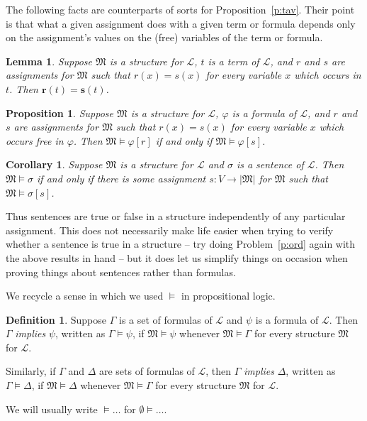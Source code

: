 \documentclass[12pt]{amsbook}
\theoremstyle{plain}
\newtheorem{prop}[thm]{Proposition}
\newtheorem{cor}[thm]{Corollary}
\newtheorem{lem}[thm]{Lemma}
\theoremstyle{definition}
\newtheorem{defn}{Definition}[chapter]
\theoremstyle{remark}
\begin{document}
The following facts are counterparts of sorts for Proposition~\ref{p:tav}.  Their point is that what a given assignment does with a given term or formula depends only on the assignment's values on the (free) variables of the term or formula.

\begin{lem}  \label{l:six7}
Suppose $\mathfrak{M}$ is a structure for $\mathcal{L}$,  $t$ is a term of $\mathcal{L}$,  and $r$ and $s$ are assignments for $\mathfrak{M}$ such that $r(x) = s(x)$ for every variable $x$ which occurs in $t$.  Then $\mathbf{r}(t) = \mathbf{s}(t)$.
\end{lem}

\begin{prop} \label{p:six8}
Suppose $\mathfrak{M}$ is a structure for $\mathcal{L}$,  $\varphi$ is a formula of $\mathcal{L}$,  and $r$ and $s$ are assignments for $\mathfrak{M}$ such that $r(x) = s(x)$ for every variable $x$ which occurs free in $\varphi$.  Then $\mathfrak{M} \models \varphi [r]$ if and only if $\mathfrak{M} \models \varphi [s]$.
\end{prop}

\begin{cor} \label{c:six9}
Suppose $\mathfrak{M}$ is a structure for $\mathcal{L}$ and $\sigma$ is a sentence of $\mathcal{L}$.  Then $\mathfrak{M} \models \sigma$ if and only if there is some assignment $s : V \to |\mathfrak{M}|$ for $\mathfrak{M}$ such that $\mathfrak{M} \models \sigma [s]$.
\end{cor}

Thus sentences are true or false in a structure independently of any particular assignment.  This does not necessarily make life easier when trying to verify whether a sentence is true in a structure -- try doing Problem~\ref{p:ord} again with the above results in hand -- but it does let us simplify things on occasion when proving things about sentences rather than formulas.

We recycle a sense in which we used $\models$\index{$\models$} in propositional logic.

\begin{defn} 
Suppose $\Gamma$ is a set of formulas of $\mathcal{L}$ and $\psi$ is a formula of $\mathcal{L}$.  Then $\Gamma$ {\em implies\/} $\psi$,  written as $\Gamma \models \psi$,  if $\mathfrak{M} \models \psi$ whenever $\mathfrak{M} \models \Gamma$ for every structure $\mathfrak{M}$ for $\mathcal{L}$.

Similarly,  if $\Gamma$ and $\Delta$ are sets of formulas of $\mathcal{L}$,  then $\Gamma$ {\em implies\/} $\Delta$,  written as $\Gamma \models \Delta$,  if $\mathfrak{M} \models \Delta$ whenever $\mathfrak{M} \models \Gamma$ for every structure $\mathfrak{M}$ for $\mathcal{L}$.  

We will usually write $\models \dots$ for $\emptyset \models \dots$.
\end{defn}
\end{document}
